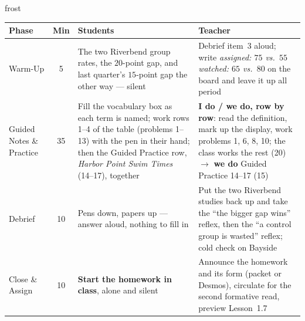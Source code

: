 \documentclass[10pt]{article}
\begin{document}
\begin{fixedskillbox}{frost}
\renewcommand{\arraystretch}{1.25}
\begin{tabularx}{\linewidth}{@{}l c X X@{}}
\textbf{Phase} & \textbf{Min} & \textbf{Students} & \textbf{Teacher} \\
\hline
Warm-Up & 5 & The two Riverbend group rates, the $20$-point gap, and last quarter's $15$-point
  gap the other way --- silent & Debrief item~3 aloud; write \emph{assigned: $75$ vs.\ $55$
  \quad watched: $65$ vs.\ $80$} on the board and leave it up all period \\
Guided Notes \& Practice & 35 & Fill the vocabulary box as each term is named; work rows 1--4
  of the table (problems 1--13) with the pen in their hand; then the Guided Practice row,
  \emph{Harbor Point Swim Times} (14--17), together & \textbf{I do / we do, row by row}: read
  the definition, mark up the display, work problems 1, 6, 8, 10; the class works the rest
  (20) $\to$ \textbf{we do} Guided Practice 14--17 (15) \\
Debrief & 10 & Pens down, papers up --- answer aloud, nothing to fill in & Put the two
  Riverbend studies back up and take the ``the bigger gap wins'' reflex, then the
  ``a control group is wasted'' reflex; cold check on Bayside \\
Close \& Assign & 10 & \textbf{Start the homework in class}, alone and silent & Announce the
  homework and its form (packet or Desmos), circulate for the second formative read, preview
  Lesson~1.7 \\
\end{tabularx}
\end{fixedskillbox}
\end{document}
